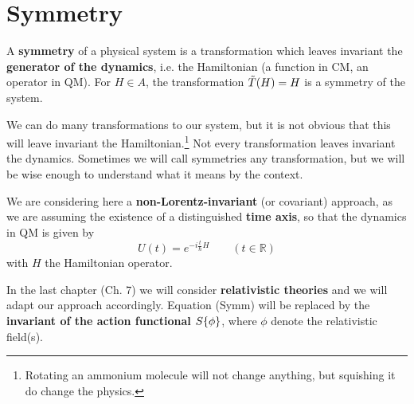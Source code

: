 \documentclass[../main.tex]{subfiles}
\begin{document}
\section{Symmetry}
\begin{kaobox}[frametitle=Terminology $\star$]
A \textbf{symmetry} of a physical system is a transformation which leaves invariant the \textbf{generator of the dynamics}, i.e. the Hamiltonian (a function in CM, an operator in QM). For $H\in A$, the transformation $\Tilde{T}(H)=H$ is a symmetry of the system.
\end{kaobox}
We can do many transformations to our system, but it is not obvious that this will leave invariant the Hamiltonian.\footnote{Rotating an ammonium molecule will not change anything, but squishing it do change the physics.} Not every transformation leaves invariant the dynamics. Sometimes we will call symmetries any transformation, but we will be wise enough to understand what it means by the context.
\begin{kaobox}[frametitle=Remark]
We are considering here a \textbf{non-Lorentz-invariant} (or covariant) approach, as we are assuming the existence of a distinguished \textbf{time axis}, so that the dynamics in QM is given by
\[
U(t) = e^{-i\frac{t}{\hslash}H} \quad \quad \left(t\in\mathbb{R}\right)
\]
with $H$ the Hamiltonian operator.
\end{kaobox}
In the last chapter (Ch. 7) we will consider \textbf{relativistic theories} and we will adapt our approach accordingly. Equation (Symm) will be replaced by the \textbf{invariant of the action functional $S\qty{\phi}$}, where $\phi$ denote the relativistic field(s).
\end{document}

